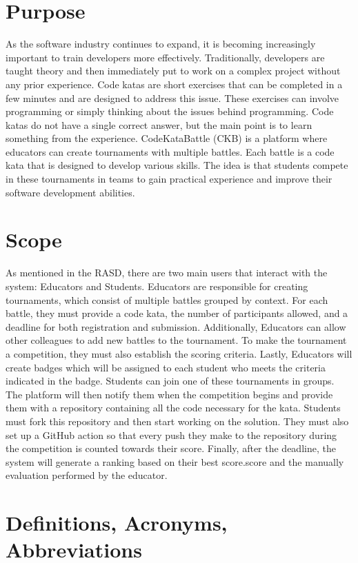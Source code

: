 \section{Purpose}
As the software industry continues to expand, it is becoming increasingly important to train developers more effectively. Traditionally, developers are taught theory and then immediately put to work on a complex project without any prior experience. Code katas are short exercises that can be completed in a few minutes and are designed to address this issue. These exercises can involve programming or simply thinking about the issues behind programming. Code katas do not have a single correct answer, but the main point is to learn something from the experience. CodeKataBattle (CKB) is a platform where educators can create tournaments with multiple battles. Each battle is a code kata that is designed to develop various skills. The idea is that students compete in these tournaments in teams to gain practical experience and improve their software development abilities. 
\section{Scope}
As mentioned in the RASD, there are two main users that interact with the system: Educators and Students. Educators are responsible for creating tournaments, which consist of multiple battles grouped by context. For each battle, they must provide a code kata, the number of participants allowed, and a deadline for both registration and submission. Additionally, Educators can allow other colleagues to add new battles to the tournament. To make the tournament a competition, they must also establish the scoring criteria. Lastly, Educators will create badges which will be assigned to each student who meets the criteria indicated in the badge. Students can join one of these tournaments in groups. The platform will then notify them when the competition begins and provide them with a repository containing all the code necessary for the kata. Students must fork this repository and then start working on the solution. They must also set up a GitHub action so that every push they make to the repository during the competition is counted towards their score. Finally, after the deadline, the system will generate a ranking based on their best score.score and the manually evaluation performed by the educator.

\section{Definitions, Acronyms, Abbreviations}
